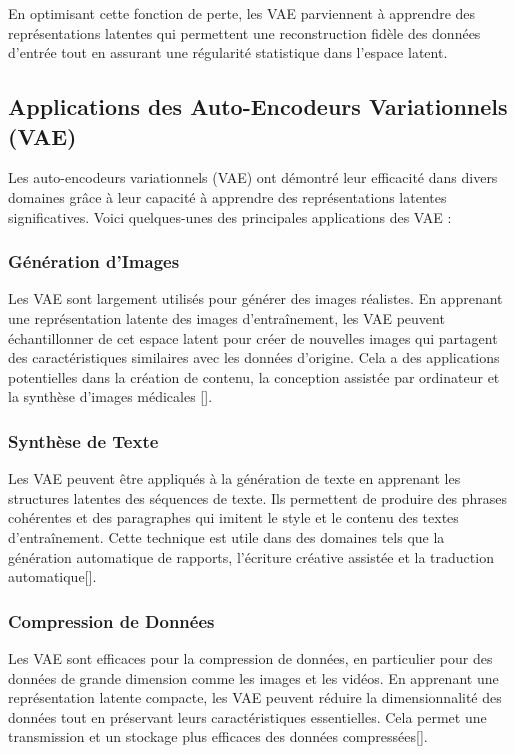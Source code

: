 En optimisant cette fonction de perte, les VAE parviennent à apprendre des
représentations latentes qui permettent une reconstruction fidèle des données
d'entrée tout en assurant une régularité statistique dans l'espace latent.

\subsection{Applications des Auto-Encodeurs Variationnels (VAE)}

Les auto-encodeurs variationnels (VAE) ont démontré leur efficacité dans divers
domaines grâce à leur capacité à apprendre des représentations latentes
significatives. Voici quelques-unes des principales applications des VAE :

\subsubsection{Génération d'Images}

Les VAE sont largement utilisés pour générer des images réalistes. En apprenant
une représentation latente des images d'entraînement, les VAE peuvent
échantillonner de cet espace latent pour créer de nouvelles images qui
partagent des caractéristiques similaires avec les données d'origine. Cela a
des applications potentielles dans la création de contenu, la conception
assistée par ordinateur et la synthèse d'images médicales
[\cite{luhman2024highfidelity}].

\subsubsection{Synthèse de Texte}

Les VAE peuvent être appliqués à la génération de texte en apprenant les
structures latentes des séquences de texte. Ils permettent de produire des
phrases cohérentes et des paragraphes qui imitent le style et le contenu des
textes d'entraînement. Cette technique est utile dans des domaines tels que la
génération automatique de rapports, l'écriture créative assistée et la
traduction automatique[\cite{wang2019topic}].

\subsubsection{Compression de Données}

Les VAE sont efficaces pour la compression de données, en particulier pour des
données de grande dimension comme les images et les vidéos. En apprenant une
représentation latente compacte, les VAE peuvent réduire la dimensionnalité des
données tout en préservant leurs caractéristiques essentielles. Cela permet une
transmission et un stockage plus efficaces des données
compressées[\cite{yilmaz2021selfvae}].

